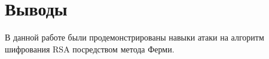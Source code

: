 \section{Выводы}

В данной работе были продемонстрированы навыки атаки на алгоритм шифрования RSA посредством метода Ферми. 